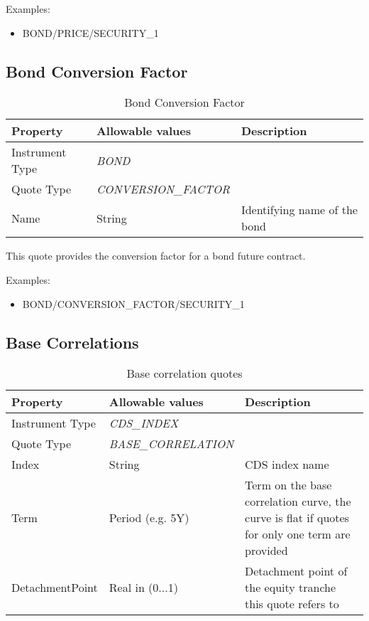 \medskip
Examples:
\begin{itemize}
	\item BOND/PRICE/SECURITY\_1
\end{itemize}

\subsection{Bond Conversion Factor}

\begin{table}[H]
\centering
  \begin{tabular}{|p{3cm}|p{3.5cm}|p{7cm}|}
  \hline
  {\bf Property} & {\bf Allowable values} & {\bf Description} \\ \hline
    Instrument Type & \emph{BOND} & \\ \hline
    Quote Type & \emph{CONVERSION\_FACTOR} & \\ \hline
    Name & String & Identifying name of the bond \\ \hline
  \end{tabular}
  \caption{Bond Conversion Factor}
  \label{tab:bond_conversion_factor}
\end{table}

This quote provides the conversion factor for a bond future contract.

\medskip
Examples:
\begin{itemize}
	\item BOND/CONVERSION\_FACTOR/SECURITY\_1
\end{itemize}

\subsection{Base Correlations}

\begin{table}[H]
\centering
  \begin{tabular}{|p{3cm}|p{3.5cm}|p{7cm}|}
  \hline
  {\bf Property} & {\bf Allowable values} & {\bf Description} \\ \hline
    Instrument Type & \emph{CDS\_INDEX} & \\ \hline
    Quote Type & \emph{BASE\_CORRELATION} & \\ \hline
    Index & String & CDS index name \\ \hline
    Term & Period (e.g. 5Y) & Term on the base correlation curve, the curve is flat if quotes for only one term are provided\\ \hline
    DetachmentPoint & Real in (0...1) & Detachment point of the equity tranche this quote refers to \\ \hline
  \end{tabular}
  \caption{Base correlation quotes}
  \label{tab:base_correlation_quote}
\end{table}

